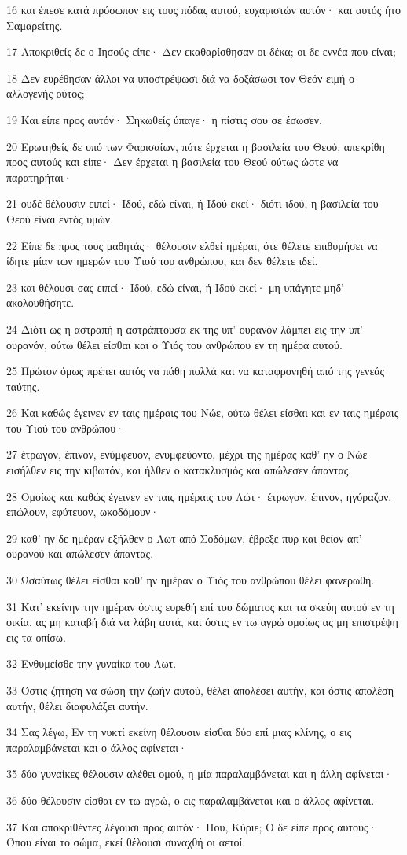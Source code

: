 \par 16 και έπεσε κατά πρόσωπον εις τους πόδας αυτού, ευχαριστών αυτόν· και αυτός ήτο Σαμαρείτης.
\par 17 Αποκριθείς δε ο Ιησούς είπε· Δεν εκαθαρίσθησαν οι δέκα; οι δε εννέα που είναι;
\par 18 Δεν ευρέθησαν άλλοι να υποστρέψωσι διά να δοξάσωσι τον Θεόν ειμή ο αλλογενής ούτος;
\par 19 Και είπε προς αυτόν· Σηκωθείς ύπαγε· η πίστις σου σε έσωσεν.
\par 20 Ερωτηθείς δε υπό των Φαρισαίων, πότε έρχεται η βασιλεία του Θεού, απεκρίθη προς αυτούς και είπε· Δεν έρχεται η βασιλεία του Θεού ούτως ώστε να παρατηρήται·
\par 21 ουδέ θέλουσιν ειπεί· Ιδού, εδώ είναι, ή Ιδού εκεί· διότι ιδού, η βασιλεία του Θεού είναι εντός υμών.
\par 22 Είπε δε προς τους μαθητάς· θέλουσιν ελθεί ημέραι, ότε θέλετε επιθυμήσει να ίδητε μίαν των ημερών του Υιού του ανθρώπου, και δεν θέλετε ιδεί.
\par 23 και θέλουσι σας ειπεί· Ιδού, εδώ είναι, ή Ιδού εκεί· μη υπάγητε μηδ' ακολουθήσητε.
\par 24 Διότι ως η αστραπή η αστράπτουσα εκ της υπ' ουρανόν λάμπει εις την υπ' ουρανόν, ούτω θέλει είσθαι και ο Υιός του ανθρώπου εν τη ημέρα αυτού.
\par 25 Πρώτον όμως πρέπει αυτός να πάθη πολλά και να καταφρονηθή από της γενεάς ταύτης.
\par 26 Και καθώς έγεινεν εν ταις ημέραις του Νώε, ούτω θέλει είσθαι και εν ταις ημέραις του Υιού του ανθρώπου·
\par 27 έτρωγον, έπινον, ενύμφευον, ενυμφεύοντο, μέχρι της ημέρας καθ' ην ο Νώε εισήλθεν εις την κιβωτόν, και ήλθεν ο κατακλυσμός και απώλεσεν άπαντας.
\par 28 Ομοίως και καθώς έγεινεν εν ταις ημέραις του Λώτ· έτρωγον, έπινον, ηγόραζον, επώλουν, εφύτευον, ωκοδόμουν·
\par 29 καθ' ην δε ημέραν εξήλθεν ο Λωτ από Σοδόμων, έβρεξε πυρ και θείον απ' ουρανού και απώλεσεν άπαντας.
\par 30 Ωσαύτως θέλει είσθαι καθ' ην ημέραν ο Υιός του ανθρώπου θέλει φανερωθή.
\par 31 Κατ' εκείνην την ημέραν όστις ευρεθή επί του δώματος και τα σκεύη αυτού εν τη οικία, ας μη καταβή διά να λάβη αυτά, και όστις εν τω αγρώ ομοίως ας μη επιστρέψη εις τα οπίσω.
\par 32 Ενθυμείσθε την γυναίκα του Λωτ.
\par 33 Όστις ζητήση να σώση την ζωήν αυτού, θέλει απολέσει αυτήν, και όστις απολέση αυτήν, θέλει διαφυλάξει αυτήν.
\par 34 Σας λέγω, Εν τη νυκτί εκείνη θέλουσιν είσθαι δύο επί μιας κλίνης, ο εις παραλαμβάνεται και ο άλλος αφίνεται·
\par 35 δύο γυναίκες θέλουσιν αλέθει ομού, η μία παραλαμβάνεται και η άλλη αφίνεται·
\par 36 δύο θέλουσιν είσθαι εν τω αγρώ, ο εις παραλαμβάνεται και ο άλλος αφίνεται.
\par 37 Και αποκριθέντες λέγουσι προς αυτόν· Που, Κύριε; Ο δε είπε προς αυτούς· Όπου είναι το σώμα, εκεί θέλουσι συναχθή οι αετοί.

